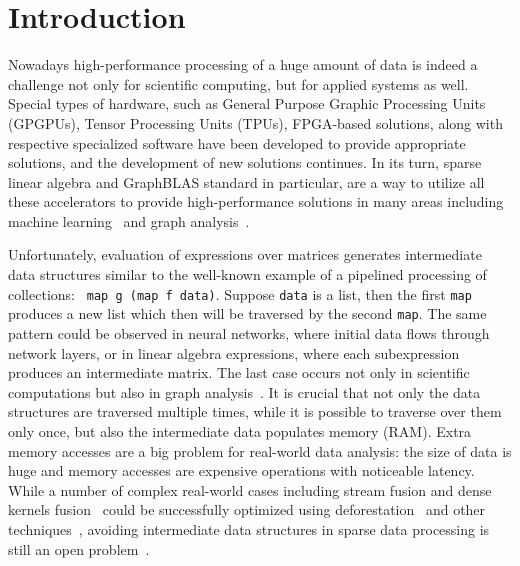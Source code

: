 \section{Introduction}

Nowadays high-performance processing of a huge amount of data is indeed a challenge not only for scientific computing, but for applied systems as well.
Special types of hardware, such as General Purpose Graphic Processing Units (GPGPUs), Tensor Processing Units (TPUs), FPGA-based solutions, along with respective specialized software have been developed to provide appropriate solutions, and the development of new solutions continues.
In its turn, sparse linear algebra and GraphBLAS standard in particular, are a way to utilize all these accelerators to provide high-performance solutions in many areas including machine learning~\cite{Kepner2017} and graph analysis~\cite{graphblast}.

Unfortunately, evaluation of expressions over matrices generates intermediate data structures similar to the well-known example of a pipelined processing of collections: \verb| map g (map f data)|. Suppose \verb|data| is a list, then the first \verb|map| produces a new list which then will be traversed by the second \verb|map|. 
The same pattern could be observed in neural networks, where initial data flows through network layers, or in linear algebra expressions, where each subexpression produces an intermediate matrix. 
The last case occurs not only in scientific computations but also in graph analysis~\cite{graphblast}.
It is crucial that not only the data structures are traversed multiple times, while it is possible to traverse over them only once, but also the intermediate data populates memory (RAM).
Extra memory accesses are a big problem for real-world data analysis: the size of data is huge and memory accesses are expensive operations with noticeable latency. %
While a number of complex real-world cases including stream fusion and dense kernels fusion~\cite{fusion-boosting-memory-computations} could be successfully optimized using deforestation~\cite{wadler-deforestation-ho} and other techniques~\cite{StreamFus}, avoiding intermediate data structures in sparse data processing is still an open problem~\cite{graphblast}.
